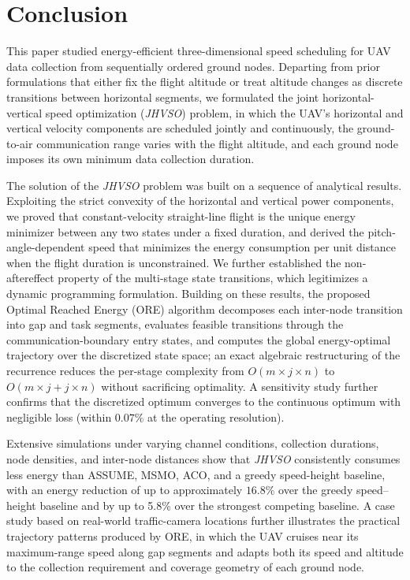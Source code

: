  \section{Conclusion}
\label{sec:conclusion}

This paper studied energy-efficient three-dimensional speed scheduling for UAV data collection from sequentially ordered ground nodes.
Departing from prior formulations that either fix the flight altitude or treat altitude changes as discrete transitions between horizontal segments, we formulated the joint horizontal-vertical speed optimization (\textit{JHVSO}) problem, in which the UAV's horizontal and vertical velocity components are scheduled jointly and continuously, the ground-to-air communication range varies with the flight altitude, and each ground node imposes its own minimum data collection duration.

The solution of the \textit{JHVSO} problem was built on a sequence of analytical results.
Exploiting the strict convexity of the horizontal and vertical power components, we proved that constant-velocity straight-line flight is the unique energy minimizer between any two states under a fixed duration, and derived the pitch-angle-dependent speed that minimizes the energy consumption per unit distance when the flight duration is unconstrained.
We further established the non-aftereffect property of the multi-stage state transitions, which legitimizes a dynamic programming formulation.
Building on these results, the proposed Optimal Reached Energy (ORE) algorithm decomposes each inter-node transition into gap and task segments, evaluates feasible transitions through the communication-boundary entry states, and computes the global energy-optimal trajectory over the discretized state space; an exact algebraic restructuring of the recurrence reduces the per-stage complexity from $O(m \times j \times n)$ to $O(m \times j + j \times n)$ without sacrificing optimality. A sensitivity study further confirms that the discretized optimum converges to the continuous optimum with negligible loss (within $0.07\%$ at the operating resolution).

Extensive simulations under varying channel conditions, collection durations, node densities, and inter-node distances show that \textit{JHVSO} consistently consumes less energy than ASSUME, MSMO, ACO, and a greedy speed-height baseline, with an energy reduction of up to approximately $16.8\%$ over the greedy speed–height baseline and by up to 5.8\% over the strongest competing baseline.
A case study based on real-world traffic-camera locations further illustrates the practical trajectory patterns produced by ORE, in which the UAV cruises near its maximum-range speed along gap segments and adapts both its speed and altitude to the collection requirement and coverage geometry of each ground node.

